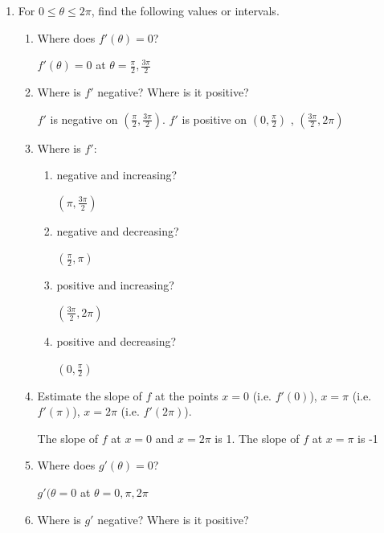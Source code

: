 \documentclass[nooutcomes]{ximera}
\begin{document}
\begin{problem}
\begin{enumerate}
	\item For $0 \leq \theta \leq 2\pi$, find the following values or intervals.
		\begin{enumerate}
			\item Where does $f'(\theta)=0$?
		\begin{freeResponse}
			$f'(\theta)=0$ at $\theta=\frac{\pi}{2},\frac{3\pi}{2}$
		\end{freeResponse}
			\item Where is $f'$ negative?  Where is it positive?
		\begin{freeResponse}
			$f'$ is negative on $\left( \frac{\pi}{2},\frac{3 \pi}{2}\right)$.  $f'$ is positive on $ \left( 0,\frac{\pi}{2} \right)$ , $ \left( \frac{3 \pi}{2},2 \pi \right)$
		\end{freeResponse}
			\item Where is $f'$:
			\begin{enumerate}
			\item negative and increasing?
				\begin{freeResponse}
					$(\pi,\frac{3\pi}{2})$
				\end{freeResponse}
			\item negative and decreasing?
				\begin{freeResponse}
					$(\frac{\pi}{2},\pi)$
				\end{freeResponse}
			\item positive and increasing?
				\begin{freeResponse}
					$(\frac{3\pi}{2},2\pi)$
				\end{freeResponse}
			\item positive and decreasing?
				\begin{freeResponse}
					$(0,\frac{\pi}{2})$
				\end{freeResponse}
			\end{enumerate}
			\item Estimate the slope of $f$ at the points $x=0$ (i.e. $f'(0)$), $x=\pi$ (i.e. $f'(\pi)$), $x=2\pi$ (i.e. $f'(2\pi)$).
				\begin{freeResponse}
					The slope of $f$ at $x=0$ and $x=2\pi$ is 1.  	The slope of $f$ at $x=\pi$ is -1
				\end{freeResponse}
			\item Where does $g'(\theta)=0$?
		\begin{freeResponse}
			$g'(\theta=0$ at $\theta=0,\pi,2\pi$
		\end{freeResponse}
			\item Where is $g'$ negative?  Where is it positive?

\end{enumerate}
\end{enumerate}
\end{problem}
\end{document}
